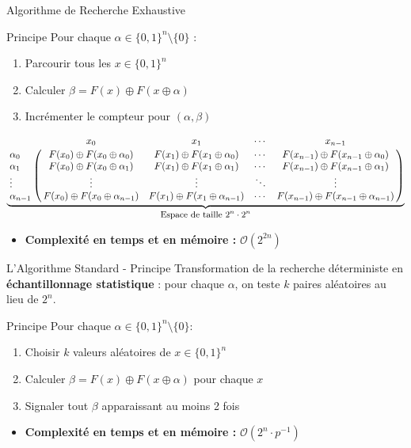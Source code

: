 \begin{frame}[t]{Algorithme de Recherche Exhaustive } %
    \begin{block}{Principe}
        Pour chaque $\alpha \in \{0,1\}^n \setminus \{0\}$ :
        \begin{enumerate}
            \item Parcourir tous les $x \in \{0,1\}^n$
            \item Calculer $\beta = F(x) \oplus F(x \oplus \alpha)$
            \item Incrémenter le compteur pour $(\alpha, \beta)$
        \end{enumerate}
    \end{block}

    \footnotesize\[
    \underbrace {
    \bordermatrix{
        & x_0 & x_1 & \cdots & x_{n-1} \cr
        \alpha_0    & F(x_0) \oplus F(x_0 \oplus \alpha_0) & F(x_1) \oplus F(x_1 \oplus \alpha_0) & \cdots & F(x_{n-1}) \oplus F(x_{n-1} \oplus \alpha_0) \cr
        \alpha_1    & F(x_0) \oplus F(x_0 \oplus \alpha_1) & F(x_1) \oplus F(x_1 \oplus \alpha_1) & \cdots & F(x_{n-1}) \oplus F(x_{n-1} \oplus \alpha_1) \cr
        \vdots      & \vdots & \vdots & \ddots & \vdots \cr
        \alpha_{n-1} & F(x_0) \oplus F(x_0 \oplus \alpha_{n-1}) & F(x_1) \oplus F(x_1 \oplus \alpha_{n-1}) & \cdots & F(x_{n-1}) \oplus F(x_{n-1} \oplus \alpha_{n-1}) \cr
    }}_{\text{\small Espace de taille $2^n \cdot 2^n $} }
    \]
    \begin{itemize}
        \item \textbf{Complexité en temps et en mémoire :} $\mathcal{O}(2^{2n})$
    \end{itemize}
\end{frame}

\begin{frame}{L'Algorithme Standard - Principe}  %
    Transformation de la recherche déterministe en \textbf{échantillonnage statistique} : pour chaque $\alpha$, on teste $k$ paires aléatoires au lieu de $2^n$.

    \begin{block}{Principe}
        Pour chaque $\alpha \in \{0,1\}^n \setminus \{0\}$:
        \begin{enumerate}
            \item Choisir $k$ valeurs aléatoires de $x \in \{0,1\}^n$
            \item Calculer $\beta = F(x) \oplus F(x \oplus \alpha)$ pour chaque $x$
            \item Signaler tout $\beta$ apparaissant au moins 2 fois
        \end{enumerate}
    \end{block}

    \begin{itemize}
        \item \textbf{Complexité en temps et en mémoire :} $\mathcal{O}(2^{n} \cdot p^{-1})$
    \end{itemize}
\end{frame}


